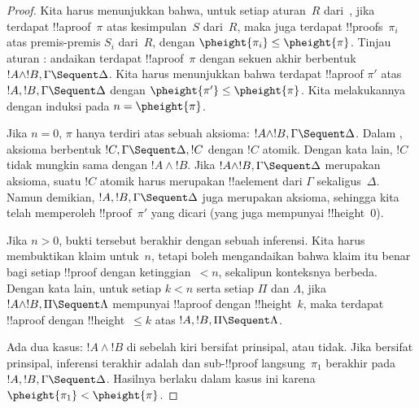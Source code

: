 \documentclass[../../../include/open-logic-section]{subfiles}
\begin{document}
\begin{proof}
Kita harus menunjukkan bahwa, untuk setiap aturan~$R$ dari~,
jika terdapat !!a{proof}~$\pi$ atas kesimpulan~$S$ dari~$R$, maka juga
terdapat !!{proof}s~$\pi_i$ atas premis-premis $S_i$ dari~$R$, dengan
$\pheight{\pi_i} \le \pheight{\pi}$. Tinjau aturan \LeftR{\land}:
andaikan terdapat !!a{proof}~$\pi$ dengan sekuen akhir berbentuk $!A
\land !B, \Gamma \Sequent \Delta$. Kita harus menunjukkan bahwa
terdapat !!a{proof} $\pi'$ atas $!A, !B, \Gamma \Sequent \Delta$
dengan $\pheight{\pi'} \le \pheight{\pi}$. Kita melakukannya dengan
induksi pada $n = \pheight{\pi}$.

Jika $n = 0$, $\pi$ hanya terdiri atas sebuah aksioma: $!A \land !B,
\Gamma \Sequent \Delta$. Dalam , aksioma berbentuk $!C,
\Gamma \Sequent \Delta, !C$ dengan $!C$ atomik. Dengan kata lain,
$!C$ tidak mungkin sama dengan $!A \land !B$. Jika $!A \land !B,
\Gamma \Sequent \Delta$ merupakan aksioma, suatu $!C$ atomik harus
merupakan !!a{element} dari $\Gamma$ sekaligus~$\Delta$. Namun demikian,
$!A, !B, \Gamma \Sequent \Delta$ juga merupakan aksioma, sehingga kita
telah memperoleh !!{proof}~$\pi'$ yang dicari (yang juga mempunyai
!!{height}~$0$).

Jika $n>0$, bukti tersebut berakhir dengan sebuah inferensi. Kita harus
membuktikan klaim untuk~$n$, tetapi boleh mengandaikan bahwa klaim itu
benar bagi setiap !!{proof} dengan ketinggian~$<n$, sekalipun konteksnya
berbeda. Dengan kata lain, untuk setiap $k<n$ serta setiap $\Pi$ dan
$\Lambda$, jika $!A \land !B, \Pi \Sequent \Lambda$ mempunyai
!!a{proof} dengan !!{height}~$k$, maka terdapat !!a{proof} dengan
!!{height}~$\le k$ atas $!A, !B, \Pi \Sequent \Lambda$.

Ada dua kasus: $!A \land !B$ di sebelah kiri bersifat prinsipal, atau
tidak. Jika bersifat prinsipal, inferensi terakhir adalah \LeftR{\land}
dan sub-!!{proof} langsung~$\pi_1$ berakhir pada $!A, !B, \Gamma
\Sequent \Delta$. Hasilnya berlaku dalam kasus ini karena
$\pheight{\pi_1} < \pheight{\pi}$.


\end{proof}
\end{document}
